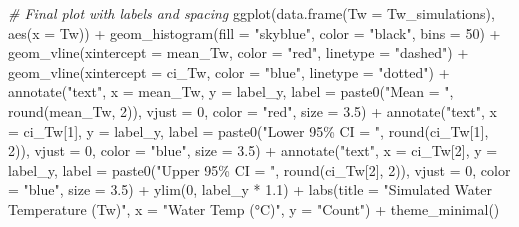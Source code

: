 \documentclass[
]{article}
\newenvironment{Shaded}{\begin{snugshade}}{\end{snugshade}}
\newcommand{\AttributeTok}[1]{\textcolor[rgb]{0.77,0.63,0.00}{#1}}
\newcommand{\CommentTok}[1]{\textcolor[rgb]{0.56,0.35,0.01}{\textit{#1}}}
\newcommand{\DecValTok}[1]{\textcolor[rgb]{0.00,0.00,0.81}{#1}}
\newcommand{\FloatTok}[1]{\textcolor[rgb]{0.00,0.00,0.81}{#1}}
\newcommand{\FunctionTok}[1]{\textcolor[rgb]{0.00,0.00,0.00}{#1}}
\newcommand{\NormalTok}[1]{#1}
\newcommand{\SpecialCharTok}[1]{\textcolor[rgb]{0.00,0.00,0.00}{#1}}
\newcommand{\StringTok}[1]{\textcolor[rgb]{0.31,0.60,0.02}{#1}}
\begin{document}
\begin{Shaded}
\begin{Highlighting}[]
\CommentTok{\# Final plot with labels and spacing}
\FunctionTok{ggplot}\NormalTok{(}\FunctionTok{data.frame}\NormalTok{(}\AttributeTok{Tw =}\NormalTok{ Tw\_simulations), }\FunctionTok{aes}\NormalTok{(}\AttributeTok{x =}\NormalTok{ Tw)) }\SpecialCharTok{+}
  \FunctionTok{geom\_histogram}\NormalTok{(}\AttributeTok{fill =} \StringTok{"skyblue"}\NormalTok{, }\AttributeTok{color =} \StringTok{"black"}\NormalTok{, }\AttributeTok{bins =} \DecValTok{50}\NormalTok{) }\SpecialCharTok{+}
  \FunctionTok{geom\_vline}\NormalTok{(}\AttributeTok{xintercept =}\NormalTok{ mean\_Tw, }\AttributeTok{color =} \StringTok{"red"}\NormalTok{, }\AttributeTok{linetype =} \StringTok{"dashed"}\NormalTok{) }\SpecialCharTok{+}
  \FunctionTok{geom\_vline}\NormalTok{(}\AttributeTok{xintercept =}\NormalTok{ ci\_Tw, }\AttributeTok{color =} \StringTok{"blue"}\NormalTok{, }\AttributeTok{linetype =} \StringTok{"dotted"}\NormalTok{) }\SpecialCharTok{+}
  \FunctionTok{annotate}\NormalTok{(}\StringTok{"text"}\NormalTok{, }\AttributeTok{x =}\NormalTok{ mean\_Tw, }\AttributeTok{y =}\NormalTok{ label\_y, }\AttributeTok{label =} \FunctionTok{paste0}\NormalTok{(}\StringTok{"Mean = "}\NormalTok{, }\FunctionTok{round}\NormalTok{(mean\_Tw, }\DecValTok{2}\NormalTok{)),}
           \AttributeTok{vjust =} \DecValTok{0}\NormalTok{, }\AttributeTok{color =} \StringTok{"red"}\NormalTok{, }\AttributeTok{size =} \FloatTok{3.5}\NormalTok{) }\SpecialCharTok{+}
  \FunctionTok{annotate}\NormalTok{(}\StringTok{"text"}\NormalTok{, }\AttributeTok{x =}\NormalTok{ ci\_Tw[}\DecValTok{1}\NormalTok{], }\AttributeTok{y =}\NormalTok{ label\_y, }\AttributeTok{label =} \FunctionTok{paste0}\NormalTok{(}\StringTok{"Lower 95\% CI = "}\NormalTok{, }\FunctionTok{round}\NormalTok{(ci\_Tw[}\DecValTok{1}\NormalTok{], }\DecValTok{2}\NormalTok{)),}
           \AttributeTok{vjust =} \DecValTok{0}\NormalTok{, }\AttributeTok{color =} \StringTok{"blue"}\NormalTok{, }\AttributeTok{size =} \FloatTok{3.5}\NormalTok{) }\SpecialCharTok{+}
  \FunctionTok{annotate}\NormalTok{(}\StringTok{"text"}\NormalTok{, }\AttributeTok{x =}\NormalTok{ ci\_Tw[}\DecValTok{2}\NormalTok{], }\AttributeTok{y =}\NormalTok{ label\_y, }\AttributeTok{label =} \FunctionTok{paste0}\NormalTok{(}\StringTok{"Upper 95\% CI = "}\NormalTok{, }\FunctionTok{round}\NormalTok{(ci\_Tw[}\DecValTok{2}\NormalTok{], }\DecValTok{2}\NormalTok{)),}
           \AttributeTok{vjust =} \DecValTok{0}\NormalTok{, }\AttributeTok{color =} \StringTok{"blue"}\NormalTok{, }\AttributeTok{size =} \FloatTok{3.5}\NormalTok{) }\SpecialCharTok{+}
  \FunctionTok{ylim}\NormalTok{(}\DecValTok{0}\NormalTok{, label\_y }\SpecialCharTok{*} \FloatTok{1.1}\NormalTok{) }\SpecialCharTok{+}
  \FunctionTok{labs}\NormalTok{(}\AttributeTok{title =} \StringTok{"Simulated Water Temperature (Tw)"}\NormalTok{,}
       \AttributeTok{x =} \StringTok{"Water Temp (°C)"}\NormalTok{, }\AttributeTok{y =} \StringTok{"Count"}\NormalTok{) }\SpecialCharTok{+}
  \FunctionTok{theme\_minimal}\NormalTok{()}
\end{Highlighting}
\end{Shaded}
\end{document}
